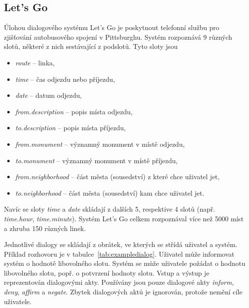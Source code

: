 \subsection{Let's Go}

Úlohou dialogového systému Let's Go je poskytnout telefonní službu pro zjišťování autobusového spojení v Pittsburghu.
Systém rozpoznává 9 různých slotů, některé z nich sestávající z podslotů.
Tyto sloty jsou
\begin{itemize}
\item \emph{route} -- linka,
\item \emph{time} -- čas odjezdu nebo příjezdu,
\item \emph{date} -- datum odjezdu,
\item \emph{from.description} -- popis místa odjezdu,
\item \emph{to.description} -- popis místa příjezdu,
\item \emph{from.monument} -- významný monument v místě odjezdu,
\item \emph{to.monument} -- významný monument v místě příjezdu,
\item \emph{from.neighborhood} -- část města (sousedství) z které chce uživatel jet,
\item \emph{to.neighborhood} -- část města (sousedství) kam chce uživatel jet.
\end{itemize}
Navíc se sloty \emph{time} a \emph{date} skládají z dalších 5, respektive 4 slotů (např. \emph{time.hour}, \emph{time.minute}).
Systém Let's Go celkem rozpoznával více než 5000 míst a zhruba 150 různých linek.

Jednotlivé dialogy se skládají z obrátek, ve kterých se střídá uživatel a systém.
Příklad rozhovoru je v tabulce~\ref{tab:exampledialog}.
Uživatel může informovat systém o hodnotě libovolného slotu.
Systém se může uživatele požádat o hodnotu libovolného slotu, popř. o potvrzení hodnoty slotu.
Vstup a výstup je reprezentován dialogovými akty.
Používány jsou pouze dialogové akty \emph{inform}, \emph{deny}, \emph{affirm} a \emph{negate}.
Zbytek dialogových aktů je ignorován, protože nemění cíle uživatele.

